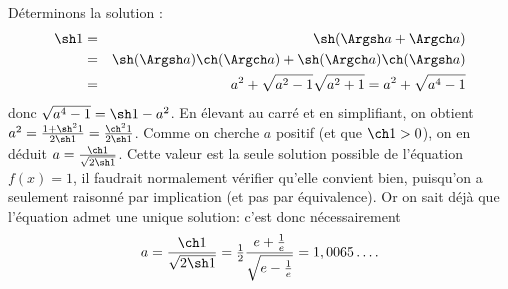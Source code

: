 {{Déterminons la solution :
\begin{eqnarray*}
\sh 1&=&\sh(\Argsh a+\Argch a)\\ 
 &=&\sh(\Argsh a)\ch(\Argch a)+\sh(\Argch a)\ch(\Argsh a)\\
 &=&a^2+\sqrt{a^2-1}\sqrt{a^2+1}=a^2+\sqrt{a^4-1}
\end{eqnarray*}
donc $\sqrt{a^4-1}=\sh 1-a^2$. En élevant au carré et en simplifiant, on obtient
$a^2=\frac{1+\sh^21}{2\sh 1}=\frac{\ch^2 1}{2\sh 1}$. Comme on cherche $a$ positif 
(et que $\ch 1>0$), on en déduit $a=\frac{\ch 1}{\sqrt{2\sh 1}}$. 
Cette valeur est la seule solution possible de l'équation $f(x)=1$, il faudrait normalement 
vérifier qu'elle convient bien, puisqu'on a seulement raisonné par implication (et pas par équivalence).
Or on sait déjà que l'équation admet une unique solution: c'est donc nécessairement 
$$a=\frac{\ch 1}{\sqrt{2\sh 1}}= \tfrac{1}{2}\frac{e+\frac1e}{\sqrt{e-\frac1e}} = 1,0065\ldots.$$
}
}

